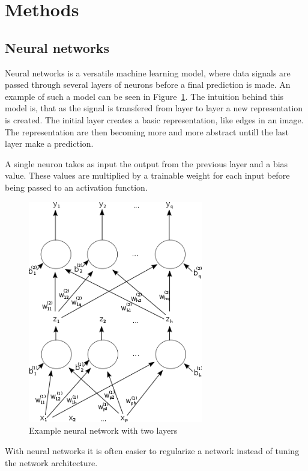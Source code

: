 \section{Methods}\label{section:methods}

\subsection{Neural networks} %
\label{sub:neural_networks}
Neural networks is a versatile machine learning model, where data signals are passed through several layers of neurons before a final prediction is made.
An example of such a model can be seen in Figure~\ref{fig:nn}.
The intuition behind this model is, that as the signal is transfered from layer to layer a new representation is created.
The initial layer creates a basic representation, like edges in an image.
The representation are then becoming more and more abstract untill the last layer make a prediction.

A single neuron takes as input the output from the previous layer and a bias value.
These values are multiplied by a trainable weight for each input before being passed to an activation function.

\begin{figure}[H]
    \centering
    \includegraphics[width=3in]{img/nn.png}
    \caption{Example neural network with two layers}
    \label{fig:nn}
\end{figure}

With neural networks it is often easier to regularize a network instead of tuning the network architecture.


